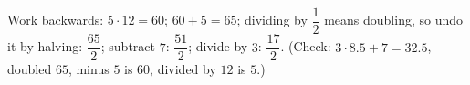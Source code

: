 Work backwards: $5\cdot12=60$; $60+5=65$; dividing by $\dfrac12$ means doubling, so undo it by halving: $\dfrac{65}2$; subtract $7$: $\dfrac{51}2$; divide by $3$: $\boxed{\dfrac{17}{2}}$. (Check: $3\cdot8.5+7=32.5$, doubled $65$, minus $5$ is $60$, divided by $12$ is $5$.)
